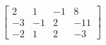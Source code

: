 \documentclass[preview]{standalone}
\begin{document}
\begin{align*}
\left[\begin{array}{ccc|c}2 & 1 & -1 & 8 \\-3 & -1 & 2 & -11 \\-2 & 1 & 2 & -3\end{array}\right]
\end{align*}
\end{document}

